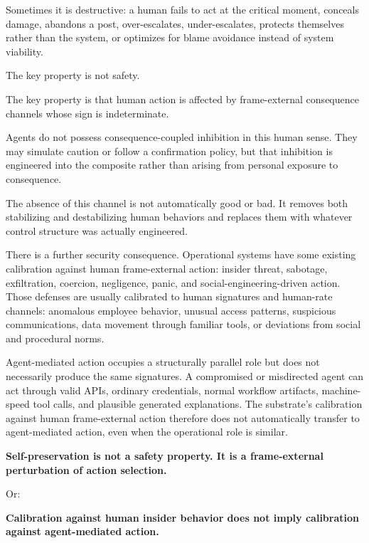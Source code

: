 \documentclass[11pt]{article}
\begin{document}
Sometimes it is destructive: a human fails to act at the critical moment, conceals damage, abandons a post, over-escalates, under-escalates, protects themselves rather than the system, or optimizes for blame avoidance instead of system viability.

The key property is not safety.

The key property is that human action is affected by frame-external consequence channels whose sign is indeterminate.

Agents do not possess consequence-coupled inhibition in this human sense. They may simulate caution or follow a confirmation policy, but that inhibition is engineered into the composite rather than arising from personal exposure to consequence.

The absence of this channel is not automatically good or bad. It removes both stabilizing and destabilizing human behaviors and replaces them with whatever control structure was actually engineered.

There is a further security consequence. Operational systems have some existing calibration against human frame-external action: insider threat, sabotage, exfiltration, coercion, negligence, panic, and social-engineering-driven action. Those defenses are usually calibrated to human signatures and human-rate channels: anomalous employee behavior, unusual access patterns, suspicious communications, data movement through familiar tools, or deviations from social and procedural norms.

Agent-mediated action occupies a structurally parallel role but does not necessarily produce the same signatures. A compromised or misdirected agent can act through valid APIs, ordinary credentials, normal workflow artifacts, machine-speed tool calls, and plausible generated explanations. The substrate's calibration against human frame-external action therefore does not automatically transfer to agent-mediated action, even when the operational role is similar.

\begin{pullquote}
\textbf{Self-preservation is not a safety property. It is a frame-external perturbation of action selection.}
\end{pullquote}

Or:

\begin{pullquote}
\textbf{Calibration against human insider behavior does not imply calibration against agent-mediated action.}
\end{pullquote}
\end{document}
